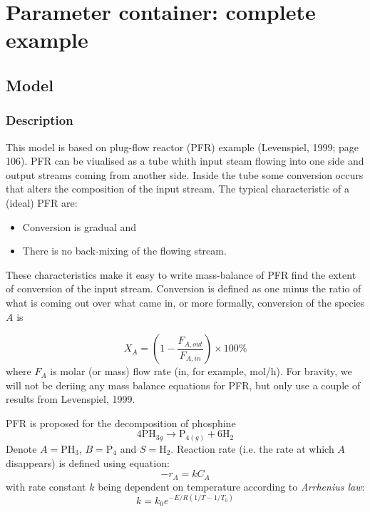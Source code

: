 \documentclass[listings, a4paper, fleqn, pdftex, 12pt, openany, oneside, final]{memoir}
\author{alexey}
\date{\today}
\title{}
\theoremstyle{definition}
\begin{document}
\tableofcontents

\chapter{Parameter container: complete example}
\label{sec:orgheadline7}
\section{Model}
\label{sec:orgheadline6}
\subsection{Description}
\label{sec:orgheadline1}
This model is based on plug-flow reactor (PFR) example (Levenspiel,
1999; page 106). PFR can be viualised as a tube whith input steam
flowing into one side and output streams coming from another
side. Inside the tube some conversion occurs that alters the
composition of the input stream. The typical characteristic of a
(ideal) PFR are:
\begin{itemize}
\item Conversion is gradual and
\item There is no back-mixing of the flowing stream.
\end{itemize}

These characteristics make it easy to write mass-balance of PFR find
the extent of conversion of the input stream. Conversion is defined as
one minus the ratio of what is coming out over what came in, or more
formally, conversion of the species \(A\) is

\begin{equation}
\label{eq:1}
X_{A} = \left(1 - \frac{F_{A,out}}{F_{A,in}} \right)\times 100\%
\end{equation}
where \(F_{A}\) is molar (or mass) flow rate (in, for example, mol/h). For
bravity, we will not be deriing any mass balance equations for PFR,
but only use a couple of results from Levenspiel, 1999.

PFR is proposed for the decomposition of
phosphine
\begin{equation*}
4\mathrm{PH}_{3g }\to \mathrm{P}_{4(g)} + 6\mathrm{H}_{2}
\end{equation*}
Denote \(A = \mathrm{PH}_{3}\), \(B = \mathrm{P}_{4}\) and \(S =
\mathrm{H}_{2}\). Reaction rate (i.e. the rate at which \(A\) disappears) is
defined using equation:
\begin{equation}
-r_{A}=kC_{A}
\end{equation}
with rate constant \(k\) being dependent on temperature according to
\emph{Arrhenius law}:
\begin{equation}
k=k_{0} e^{-E/R(1/T-1/T_{0})}
\end{equation}
\end{document}
